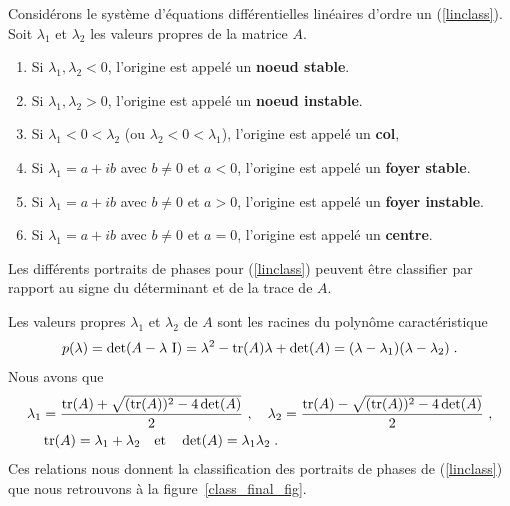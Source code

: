 {\begin{defn}
Considérons le système d'équations différentielles linéaires d'ordre un
(\ref{linclass}).   Soit $\lambda_1$ et $\lambda_2$ les valeurs
propres de la matrice $A$.
\begin{enumerate}
\item Si $\lambda_1, \lambda_2 < 0$, l'origine est appelé un 
  {\bfseries noeud stable}.
\item Si $\lambda_1, \lambda_2 > 0$, l'origine est appelé un 
  {\bfseries noeud instable}.
\item Si $\lambda_1 < 0 < \lambda_2$ (ou $\lambda_2 < 0 < \lambda_1$),
  l'origine est appelé un {\bfseries col},
\item Si $\lambda_1 = a + i b$ avec $b \neq 0$ et $a<0$, l'origine est
  appelé un {\bfseries foyer stable}.
\item Si $\lambda_1 = a + i b$ avec $b \neq 0$ et $a>0$, l'origine est
  appelé un {\bfseries foyer instable}.
\item Si $\lambda_1 = a + i b$ avec $b \neq 0$ et $a=0$, l'origine est
  appelé un {\bfseries centre}.
\end{enumerate}
\end{defn}

Les différents portraits de phases pour (\ref{linclass}) peuvent être
classifier par rapport au signe du déterminant et de la trace de
$A$.

Les valeurs propres $\lambda_1$ et $\lambda_2$ de $A$ sont les racines du
polynôme caractéristique
\[
p(\lambda) = \det(A-\lambda\,\operatorname{I})
= \lambda^2 - \operatorname{tr}(A) \lambda + \det(A)
= (\lambda - \lambda_1)(\lambda - \lambda_2) \; .
\]
Nous avons que
\begin{align*}
\lambda_1 &= \frac{\operatorname{tr}(A) + \sqrt{ (\operatorname{tr}(A))^2 - 4 \det(A) }}{2} \ , \quad
\lambda_2 = \frac{\operatorname{tr}(A) - \sqrt{ (\operatorname{tr}(A))^2 - 4 \det(A) }}{2} \ ,\\
&\operatorname{tr}(A) = \lambda_1+\lambda_2 \quad \text{et} \quad
\det(A) = \lambda_1\lambda_2 \; .
\end{align*}
Ces relations nous donnent la classification des portraits de
phases de (\ref{linclass}) que nous retrouvons à la
figure~\ref{class_final_fig}.

}

